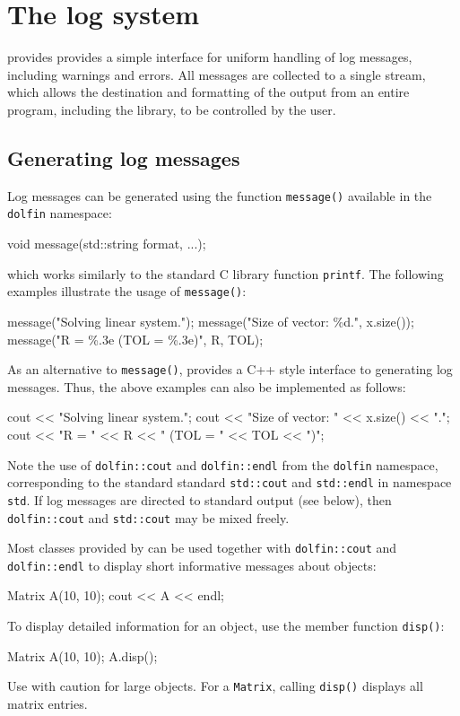 \chapter{The log system}

\dolfin{} provides provides a simple interface for uniform handling of
log messages, including warnings and errors. All messages are
collected to a single stream, which allows the destination and
formatting of the output from an entire program, including the
\dolfin{} library, to be controlled by the user.

\section{Generating log messages}

Log messages can be generated using the function
\texttt{message()} available in the \texttt{dolfin} namespace:
\begin{code}
void message(std::string format, ...);
\end{code}
which works similarly to the standard C library function \texttt{printf}.
The following examples illustrate the usage of
\texttt{message()}:
\begin{code}
message("Solving linear system.");
message("Size of vector: \%d.", x.size());
message("R = \%.3e (TOL = \%.3e)", R, TOL);
\end{code}

As an alternative to \texttt{message()}, \dolfin{} provides a C++
style interface to generating log messages. Thus, the above examples
can also be implemented as follows:
\footnotesize
\begin{code}
cout << "Solving linear system.\n";
cout << "Size of vector: " << x.size() << ".\n";
cout << "R = " << R << " (TOL = " << TOL << ")\n";
\end{code}
\normalsize
Note the use of \texttt{dolfin::cout} and
\texttt{dolfin::endl} from the \texttt{dolfin} namespace,
corresponding to the standard standard \texttt{std::cout} and
\texttt{std::endl} in namespace \texttt{std}. If log messages are
directed to standard output (see below), then \texttt{dolfin::cout}
and \texttt{std::cout} may be mixed freely.

Most classes provided by \dolfin{} can be used together with
\texttt{dolfin::cout} and \texttt{dolfin::endl} to display short
informative messages about objects:
\begin{code}
Matrix A(10, 10);
cout << A << endl;
\end{code}
To display detailed information for an object,  use the member function
\texttt{disp()}:
\begin{code}
Matrix A(10, 10);
A.disp();
\end{code}
Use with caution for large objects. For a \texttt{Matrix}, calling
\texttt{disp()} displays all matrix entries.

